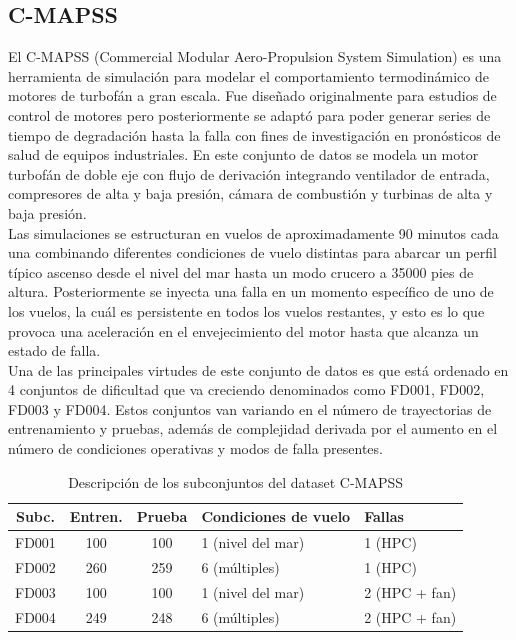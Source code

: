 \subsection{C-MAPSS}

El C-MAPSS (Commercial Modular Aero-Propulsion System Simulation) \cite{saxena2008} es una herramienta de simulación para modelar el comportamiento termodinámico de motores de turbofán a gran escala. Fue diseñado originalmente para estudios de control de motores pero posteriormente se adaptó para poder generar series de tiempo de degradación hasta la falla con fines de investigación en pronósticos de salud de equipos industriales. En este conjunto de datos se modela un motor turbofán de doble eje con flujo de derivación integrando ventilador de entrada, compresores de alta y baja presión, cámara de combustión y turbinas de alta y baja presión.\\[.15cm]

Las simulaciones se estructuran en vuelos de aproximadamente 90 minutos cada una combinando diferentes condiciones de vuelo distintas para abarcar un perfil típico ascenso desde el nivel del mar hasta un modo crucero a 35000 pies de altura. Posteriormente se inyecta una falla en un momento específico de uno de los vuelos, la cuál es persistente en todos los vuelos restantes, y esto es lo que provoca una aceleración en el envejecimiento del motor hasta que alcanza un estado de falla.\\[.15cm]

Una de las principales virtudes de este conjunto de datos es que está ordenado en 4 conjuntos de dificultad que va creciendo denominados como FD001, FD002, FD003 y FD004. Estos conjuntos van variando en el número de trayectorias de entrenamiento y pruebas, además de complejidad derivada por el aumento en el número de condiciones operativas y modos de falla presentes.

\begin{table}[H]
\centering
\small
\setlength{\tabcolsep}{4pt} %
\caption{Descripción de los subconjuntos del dataset C-MAPSS}
\label{tab:cmapss}
\begin{tabular}{c c c p{3cm} p{3.2cm}}
\toprule
\textbf{Subc.} & \textbf{Entren.} & \textbf{Prueba} & \textbf{Condiciones de vuelo} & \textbf{Fallas} \\
\midrule
FD001 & 100 & 100 & 1 (nivel del mar) & 1 (HPC) \\
FD002 & 260 & 259 & 6 (múltiples) & 1 (HPC) \\
FD003 & 100 & 100 & 1 (nivel del mar) & 2 (HPC + fan) \\
FD004 & 249 & 248 & 6 (múltiples) & 2 (HPC + fan) \\
\bottomrule
\end{tabular}
\end{table}

